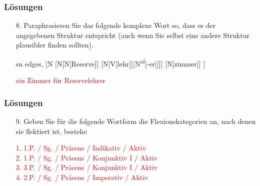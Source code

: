 {%

\begin{frame}
\frametitle{Lösungen}

\begin{itemize}
	
	\item [8.] Paraphrasieren Sie das folgende komplexe Wort so, dass es der angegebenen Struktur entspricht (auch wenn Sie selbst eine andere Struktur plausibler finden sollten). %
	
	\begin{forest}sn edges,
		[N
		[N[N[Reserve]]
		[N[V[lehr]][N\textsuperscript{af}[-er]]]]
		[N[zimmer]]
		]
	\end{forest}
	
	\item[] \textcolor{red}{
		ein Zimmer für Reservelehrer
	}
\end{itemize}

\end{frame}



\begin{frame}
\frametitle{Lösungen}

\begin{itemize}

\item [9.] Geben Sie für die folgende Wortform die Flexionskategorien an, nach denen sie flektiert ist.%
\ea
bestehe
\z

\item [] \textcolor{red}{
	1. \ras 1.P. / Sg. / Präsens / Indikativ / Aktiv\\
	2. \ras 1.P. / Sg. / Präsens / Konjunktiv I / Aktiv\\
	3. \ras 3.P. / Sg. / Präsens / Konjunktiv I / Aktiv\\
	4. \ras 2.P. / Sg. / Präsens / Imperativ / Aktiv\\
}
\end{itemize}

\end{frame}

}

